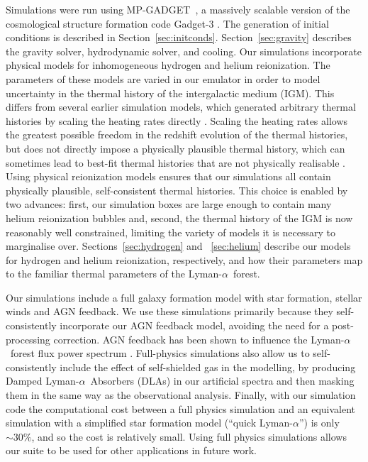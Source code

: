 \documentclass[a4paper,11pt]{article}
\newcommand{\Lya}{Lyman-$\alpha$}
\newcommand{\mpgadget}{{\small MP-GADGET}}
\begin{document}
Simulations were run using \mpgadget~\cite{MPGadget2018, Bird:2022}, a massively scalable version of the cosmological structure formation code Gadget-3 \cite{Springel:2005}. The generation of initial conditions is described in Section~\ref{sec:initconds}. Section~\ref{sec:gravity} describes the gravity solver, hydrodynamic solver, and cooling. Our simulations incorporate physical models for inhomogeneous hydrogen and helium reionization. The parameters of these models are varied in our emulator in order to model uncertainty in the thermal history of the intergalactic medium (IGM).
This differs from several earlier simulation models, which generated arbitrary thermal histories by scaling the heating rates directly \cite[e.g.~][]{Viel:2006, Viel:2013wdm, Irsic:2017, Garzilli:2019}. Scaling the heating rates allows the greatest possible freedom in the redshift evolution of the thermal histories, but does not directly impose a physically plausible thermal history, which can sometimes lead to best-fit thermal histories that are not physically realisable \cite{Walther:2019}.
Using physical reionization models ensures that our simulations all contain physically plausible, self-consistent thermal histories. This choice is enabled by two advances: first, our simulation boxes are large enough to contain many helium reionization bubbles and, second, the thermal history of the IGM is now reasonably well constrained, limiting the variety of models it is necessary to marginalise over.
Sections~\ref{sec:hydrogen} and ~\ref{sec:helium} describe our models for hydrogen and helium reionization, respectively, and how their parameters map to the familiar thermal parameters of the \Lya~forest.

Our simulations include a full galaxy formation model with star formation, stellar winds and AGN feedback. We use these simulations primarily because they self-consistently incorporate our AGN feedback model, avoiding the need for a post-processing correction. AGN feedback has been shown to influence the \Lya~forest flux power spectrum \cite{Viel:2013, Chabanier:2020}. Full-physics simulations also allow us to self-consistently include the effect of self-shielded gas in the modelling, by producing Damped \Lya~Absorbers (DLAs) in our artificial spectra and then masking them in the same way as the observational analysis.
Finally, with our simulation code the computational cost between a full physics simulation and an equivalent simulation with a simplified star formation model (``quick \Lya'') is only $\sim 30\%$, and so the cost is relatively small. Using full physics simulations allows our suite to be used for other applications in future work.
\end{document}
